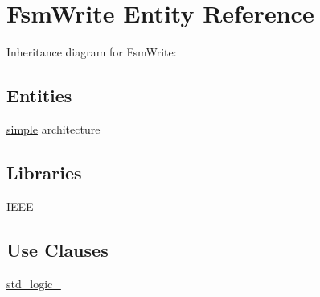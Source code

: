 \hypertarget{class_fsm_write}{}\section{Fsm\+Write Entity Reference}
\label{class_fsm_write}


Inheritance diagram for Fsm\+Write\+:
\subsection*{Entities}
\begin{DoxyCompactItemize}
\item 
\hyperlink{class_fsm_write_1_1simple}{simple} architecture
\end{DoxyCompactItemize}
\subsection*{Libraries}
 \begin{DoxyCompactItemize}
\item 
\hyperlink{class_fsm_write_ae4f03c286607f3181e16b9aa12d0c6d4}{I\+E\+E\+E} 
\end{DoxyCompactItemize}
\subsection*{Use Clauses}
 \begin{DoxyCompactItemize}
\item 
\hyperlink{class_fsm_write_acd03516902501cd1c7296a98e22c6fcb}{std\+\_\+logic\+\_}   
\end{DoxyCompactItemize}
